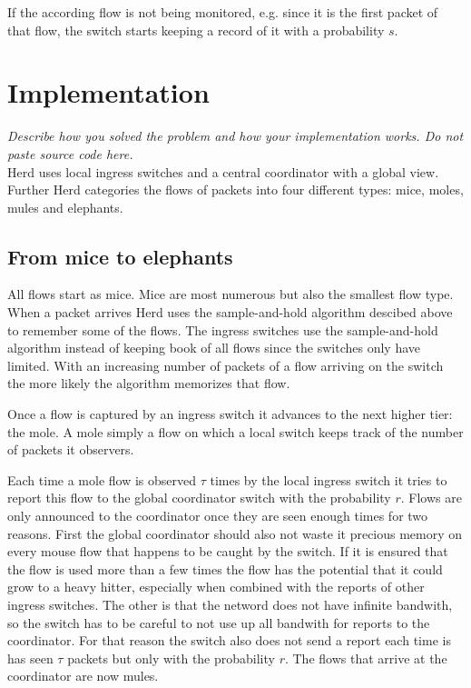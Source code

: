 \documentclass[11pt,oneside,a4paper]{article}
\newcommand{\hint}[1]{{\color{blue} \em #1}}
\begin{document}
If the according flow is not being monitored, e.g. since it is the first packet of that flow, the switch starts keeping a record of it with
a probability $s$.\\


\section{Implementation}
\hint{Describe how you solved the problem and how your implementation works. Do not paste source code here.} \\
Herd uses local ingress switches and a central coordinator with a global view. Further Herd categories the flows of packets into four different types: mice, moles, mules and elephants.

\subsection{From mice to elephants} \label{animals}
All flows start as mice. Mice are most numerous but also the smallest flow type. When a packet arrives Herd uses the sample-and-hold algorithm descibed above to remember some of the flows. The ingress switches use the sample-and-hold algorithm instead of keeping book of all flows since the switches only have limited. With an increasing number of packets of a flow arriving on the switch the more likely the algorithm memorizes that flow.

Once a flow is captured by an ingress switch it advances to the next higher tier: the mole. A mole simply a flow on which a local switch keeps track of the number of packets it observers.

Each time a mole flow is observed $\tau$ times by the local ingress switch it tries to report this flow to the global coordinator switch with the probability $r$. Flows are only announced to the coordinator once they are seen enough times for two reasons. First the global coordinator should also not waste it precious memory on every mouse flow that happens to be caught by the switch. If it is ensured that the flow is used more than a few times the flow has the potential that it could grow to a heavy hitter, especially when combined with the reports of other ingress switches. The other is that the netword does not have infinite bandwith, so the switch has to be careful to not use up all bandwith for reports to the coordinator. For that reason the switch also does not send a report each time is has seen $\tau$ packets but only with the probability $r$. The flows that arrive at the coordinator are now mules.
\end{document}
